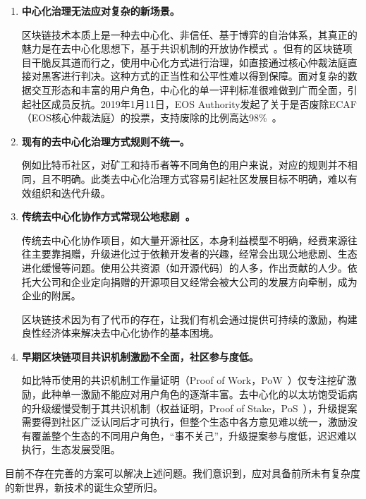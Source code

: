 \begin{enumerate}
	\item 

	\textbf{中心化治理无法应对复杂的新场景。}

	区块链技术本质上是⼀种去中心化、⾮信任、基于博弈的⾃治体系，其真正的魅力是在去中⼼化思想下，基于共识机制的开放协作模式~\cite{whitepaper}。但有的区块链项目干脆反其道而行之，使用中心化方式进行治理，如直接通过核心仲裁法庭直接对黑客进行判决。这种方式的正当性和公平性难以得到保障。面对复杂的数据交互形态和丰富的用户角色，中心化的单一评判标准很难做到广而全面，引起社区成员反抗。2019年1月11日，EOS Authority发起了关于是否废除ECAF（EOS核心仲裁法庭）的投票，支持废除的比例高达98\%~\cite{DeleteECAF}。

	\item 

	\textbf{现有的去中心化治理方式规则不统一。}

	例如比特币社区，对矿工和持币者等不同角色的用户来说，对应的规则并不相同，且不明确。此类去中心化治理方式容易引起社区发展目标不明确，难以有效组织和迭代升级。

	\item 

	\textbf{传统去中心化协作方式常现公地悲剧~\cite{TragedyOfTheCommons}。}

	传统去中心化协作项目，如大量开源社区，本身利益模型不明确，经费来源往往主要靠捐赠，升级进化过于依赖开发者的兴趣，经常会出现公地悲剧、生态进化缓慢等问题。使用公共资源（如开源代码）的人多，作出贡献的人少。依托大公司和企业定向捐赠的开源项目又经常会被大公司的发展方向牵制，成为企业的附属。

	区块链技术因为有了代币的存在，让我们有机会通过提供可持续的激励，构建良性经济体来解决去中心化协作的基本困境。

	\item

	\textbf{早期区块链项目共识机制激励不全面，社区参与度低。}

	如比特币使用的共识机制工作量证明（Proof of Work，PoW~\cite{pow}）仅专注挖矿激励，此种单一激励不能应对用户角色的逐渐丰富。去中心化的以太坊饱受诟病的升级缓慢受制于其共识机制（权益证明，Proof of Stake，PoS~\cite{pos}），升级提案需要得到社区广泛认同后才可执行，但整个生态中各方意见难以统一，激励没有覆盖整个生态的不同用户角色，“事不关己”，升级提案参与度低，迟迟难以执行，生态发展受阻。

\end{enumerate}

目前不存在完善的方案可以解决上述问题。我们意识到，应对具备前所未有复杂度的新世界，新技术的诞生众望所归。

